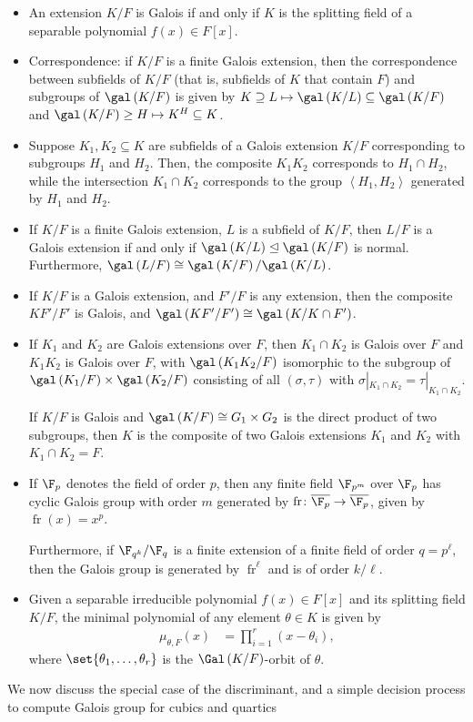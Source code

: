 \documentclass[10pt]{mypackage}
\begin{document}
\begin{itemize}
  \item An extension $K/F$ is Galois if and only if $K$ is the splitting field of a separable polynomial $f(x)\in F[x]$.
  \item Correspondence: if $K/F$ is a finite Galois extension, then the correspondence between subfields of $K/F$ (that is, subfields of $K$ that contain $F$) and subgroups of $\gal\left( K/F \right)$ is given by $K\supseteq L\mapsto \gal\left( K/L \right)\subseteq \gal\left( K/F \right)$ and $\gal\left( K/F \right)\geq H\mapsto K^{H}\subseteq K$.
  \item Suppose $K_1,K_2\subseteq K$ are subfields of a Galois extension $K/F$ corresponding to subgroups $H_1$ and $H_2$. Then, the composite $K_1K_2$ corresponds to $H_1\cap H_2$, while the intersection $K_1\cap K_2$ corresponds to the group $ \left\langle H_1,H_2 \right\rangle $ generated by $H_1$ and $H_2$.
  \item If $K/F$ is a finite Galois extension, $L$ is a subfield of $K/F$, then $L/F$ is a Galois extension if and only if $\gal\left( K/L \right)\trianglelefteq \gal\left( K/F \right)$ is normal. Furthermore, $\gal\left( L/F \right)\cong \gal\left( K/F \right)/\gal\left( K/L \right)$.
  \item If $K/F$ is a Galois extension, and $F'/F$ is any extension, then the composite $KF'/F'$ is Galois, and $\gal\left( KF'/F' \right)\cong \gal\left( K/K\cap F' \right)$.
  \item If $K_1$ and $K_2$ are Galois extensions over $F$, then $K_1\cap K_2$ is Galois over $F$ and $K_1K_2$ is Galois over $F$, with $\gal\left( K_1K_2/F \right)$ isomorphic to the subgroup of $\gal\left( K_1/F \right)\times \gal\left( K_2/F \right)$ consisting of all $\left( \sigma,\tau \right)$ with $\sigma|_{K_1\cap K_2} = \tau|_{K_1\cap K_2}$.

    If $K/F$ is Galois and $\gal\left( K/F \right)\cong G_1\times G_2$ is the direct product of two subgroups, then $K$ is the composite of two Galois extensions $K_1$ and $K_2$ with $K_1\cap K_2 = F$.
  \item If $\F_p$ denotes the field of order $p$, then any finite field $\F_{p^{m}}$ over $\F_p$ has cyclic Galois group with order $m$ generated by $\operatorname{fr}\colon \overline{\F_p}\rightarrow \overline{\F_p}$, given by $ \operatorname{fr}\left( x \right) = x^{p} $.

    Furthermore, if $ \F_{q^{k}}/\F_q $ is a finite extension of a finite field of order $q = p^{\ell}$, then the Galois group is generated by $ \operatorname{fr}^{\ell} $ and is of order $k/\ell$.
  \item Given a separable irreducible polynomial $f(x)\in F[x]$ and its splitting field $K/F$, the minimal polynomial of any element $\theta\in K$ is given by
    \begin{align*}
      \mu_{\theta,F}(x) &= \prod_{i=1}^{r} \left( x-\theta_i \right),
    \end{align*}
    where $\set{\theta_1,\dots,\theta_r}$ is the $\Gal\left( K/F \right)$-orbit of $\theta$.
\end{itemize}
We now discuss the special case of the discriminant, and a simple decision process to compute Galois group for cubics and quartics
\end{document}
